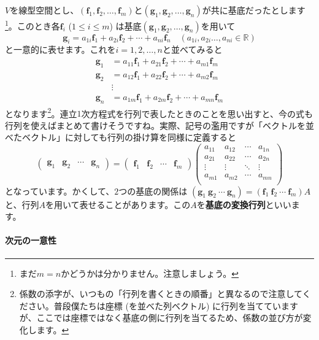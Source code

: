 $V$を線型空間とし、$(\bm{f}_1, \bm{f}_2, \ldots, \bm{f}_m)$と$(\bm{g}_1, \bm{g}_2, \ldots, \bm{g}_n)$が共に基底だったとします\footnote{まだ$m = n$かどうかは分かりません。注意しましょう。}。このとき各$\bm{f}_i$ ($1\leq i \leq m$) は基底$(\bm{g}_1, \bm{g}_2, \ldots, \bm{g}_n)$を用いて
\[
\bm{g}_i = a_{1i} \bm{f}_1 + a_{2i} \bm{f}_2 + \cdots + a_{ni} \bm{f}_n \quad (a_{1i}, a_{2i} \ldots, a_{ni} \in \mathbb{R})
\]
と一意的に表せます。これを$i = 1, 2, \ldots, n$と並べてみると
\begin{align*}
\bm{g}_1 &= a_{11} \bm{f}_1 + a_{21} \bm{f}_2 + \cdots + a_{m1} \bm{f}_m \\
\bm{g}_2 &= a_{12} \bm{f}_1 + a_{22} \bm{f}_2 + \cdots + a_{m2} \bm{f}_m \\
&\vdots \\
\bm{g}_n &= a_{1m} \bm{f}_1 + a_{2m} \bm{f}_2 + \cdots + a_{mn} \bm{f}_m
\end{align*}
となります\footnote{係数の添字が、いつもの「行列を書くときの順番」と異なるので注意してください。普段僕たちは座標 (を並べた列ベクトル) に行列を当てていますが、ここでは座標ではなく基底の側に行列を当てるため、係数の並び方が変化します。}。連立$1$次方程式を行列で表したときのことを思い出すと、今の式も行列を使えばまとめて書けそうですね。実際、記号の濫用ですが「ベクトルを並べたベクトル」に対しても行列の掛け算を同様に定義すると
\[
\begin{pmatrix}
\bm{g}_1 & \bm{g}_2 & \cdots & \bm{g}_n
\end{pmatrix}
=
\begin{pmatrix}
\bm{f}_1 & \bm{f}_2 & \cdots & \bm{f}_m
\end{pmatrix}
\begin{pmatrix}
a_{11} & a_{12} & \cdots & a_{1n} \\
a_{21} & a_{22} & \cdots & a_{2n} \\
\vdots & \vdots & \ddots & \vdots \\
a_{m1} & a_{m2} & \cdots & a_{mn} \\
\end{pmatrix}
\]
となっています。かくして、$2$つの基底の関係は
$(\bm{g}_1 \  \bm{g}_2 \  \cdots \  \bm{g}_n ) = (\bm{f}_1 \  \bm{f}_2 \  \cdots \  \bm{f}_m ) A$
と、行列$A$を用いて表せることがあります。この$A$を\textbf{基底の変換行列}といいます。

\paragraph{次元の一意性}

